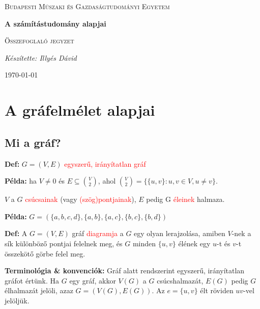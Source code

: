 \documentclass[12pt]{article}
\begin{document}
\begin{titlepage}
	\centering \vfill
	{\textsc{Budapesti Műszaki és Gazdaságtudományi Egyetem} \par} \vspace{7cm}
	{\huge\bfseries A számítástudomány alapjai\par} \vspace{0.5cm}
	{\large \textsc{Összefoglaló jegyzet}\par} \vspace{1.5cm}
	{\Large\itshape Készítette: Illyés Dávid\par} \vfill

	\noindent{}
	
	\vfill {\large \today\par}
\end{titlepage} 
\tableofcontents
{}

	\section{A gráfelmélet alapjai}
		\subsection{Mi a gráf?}
			
			\textbf{Def:} $G = (V,E)$ \textcolor{red}{egyszerű, irányítatlan gráf}
			
			\textbf{Példa:} ha $ V \neq 0$ és $E \subseteq \binom{V}{2}$, ahol $\binom{V}{2} = \{\{u,v\} : u,v \in V, u \neq v\}$.
			
			$V$ a $G$ \textcolor{red}{csúcsainak} (vagy \textcolor{red}{(szög)pontjainak}), $E$ pedig G \textcolor{red}{éleinek} halmaza. 
			
			\textbf{Példa:} $G = (\{a,b,c,d\},\{a,b\},\{a,c\},\{b,c\},\{b,d\})$
			
			\textbf{Def:} A $G = (V,E)$ gráf \textcolor{red}{diagramja} a $G$ egy olyan lerajzolása, amiben $V$-nek a sík különböző pontjai felelnek meg, és $G$ minden $\{u,v\}$ élének egy $u$-t és $v$-t összekötő görbe felel meg.
			
			\textbf{Terminológia \& konvenciók:} Gráf alatt rendszerint egyszerű, irányítatlan gráfot értünk. Ha $G$ egy gráf, akkor $V(G)$ a $G$ csúcshalmazát, $E(G)$ pedig $G$ élhalmazát jelöli, azaz $G = (V(G),E(G))$. Az $e = \{u,v\}$ élt röviden $uv$-vel jelöljük. 
			
\end{document}
